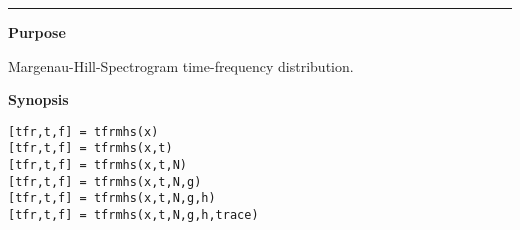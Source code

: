 

\hspace*{-1.6cm}{\Large \bf tfrmhs}

\vspace*{-.4cm}
\hspace*{-1.6cm}\rule[0in]{16.5cm}{.02cm}
\vspace*{.2cm}

{\bf \large {}\selectfont Purpose}\\
\hspace*{1.5cm}
\begin{minipage}[t]{13.5cm}
Margenau-Hill-Spectrogram time-frequency distribution.
\end{minipage}
\vspace*{.5cm}

{\bf \large {}\selectfont Synopsis}\\
\hspace*{1.5cm}
\begin{minipage}[t]{13.5cm}
\begin{verbatim}
[tfr,t,f] = tfrmhs(x)
[tfr,t,f] = tfrmhs(x,t)
[tfr,t,f] = tfrmhs(x,t,N)
[tfr,t,f] = tfrmhs(x,t,N,g)
[tfr,t,f] = tfrmhs(x,t,N,g,h)
[tfr,t,f] = tfrmhs(x,t,N,g,h,trace)
\end{verbatim}
\end{minipage}
\vspace*{.5cm}


